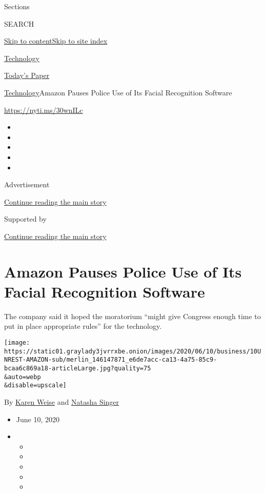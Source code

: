 Sections

SEARCH

\protect\hyperlink{site-content}{Skip to
content}\protect\hyperlink{site-index}{Skip to site index}

\href{https://www.nytimes3xbfgragh.onion/section/technology}{Technology}

\href{https://myaccount.nytimes3xbfgragh.onion/auth/login?response_type=cookie\&client_id=vi}{}

\href{https://www.nytimes3xbfgragh.onion/section/todayspaper}{Today's
Paper}

\href{/section/technology}{Technology}\textbar{}Amazon Pauses Police Use
of Its Facial Recognition Software

\url{https://nyti.ms/30wnILc}

\begin{itemize}
\item
\item
\item
\item
\item
\end{itemize}

Advertisement

\protect\hyperlink{after-top}{Continue reading the main story}

Supported by

\protect\hyperlink{after-sponsor}{Continue reading the main story}

\hypertarget{amazon-pauses-police-use-of-its-facial-recognition-software}{%
\section{Amazon Pauses Police Use of Its Facial Recognition
Software}\label{amazon-pauses-police-use-of-its-facial-recognition-software}}

The company said it hoped the moratorium ``might give Congress enough
time to put in place appropriate rules'' for the technology.

\texttt{[image: https://static01.graylady3jvrrxbe.onion/images/2020/06/10/business/10UNREST-AMAZON-sub/merlin\_146147871\_e6de7acc-ca13-4a75-85c9-bcaa6c869a18-articleLarge.jpg?quality=75\\\&auto=webp\\\&disable=upscale]}

By \href{https://www.nytimes3xbfgragh.onion/by/karen-weise}{Karen Weise}
and \href{https://www.nytimes3xbfgragh.onion/by/natasha-singer}{Natasha
Singer}

\begin{itemize}
\item
  June 10, 2020
\item
  \begin{itemize}
  \item
  \item
  \item
  \item
  \item
  \end{itemize}
\end{itemize}


